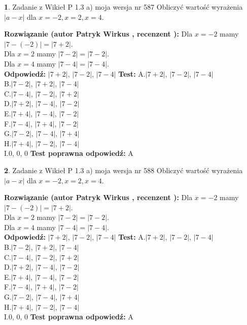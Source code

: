 \documentclass[12pt, a4paper]{article}
\theoremstyle{definition} %
\newtheorem{zad}{}
\newcommand{\zadStart}[1]{\begin{zad}#1\newline}
\newcommand{\zadStop}{\end{zad}}
\newcommand{\rozwStart}[2]{\noindent \textbf{Rozwiązanie (autor #1 , recenzent #2): }\newline}
\newcommand{\rozwStop}{\newline}
\newcommand{\odpStart}{\noindent \textbf{Odpowiedź:}\newline}
\newcommand{\odpStop}{\newline}
\newcommand{\testStart}{\noindent \textbf{Test:}\newline}
\newcommand{\testStop}{\newline}
\newcommand{\kluczStart}{\noindent \textbf{Test poprawna odpowiedź:}\newline}
\newcommand{\kluczStop}{\newline}
\begin{document}
\zadStart{Zadanie z Wikieł P 1.3 a) moja wersja nr 587}
Obliczyć wartość wyrażenia $|a - x|$ dla $x=-2,x=2,x=4$.
\zadStop
\rozwStart{Patryk Wirkus}{}
Dla $x = -2$ mamy $|7 - (-2)| = |7 + 2|$.\\
Dla $x = 2$ mamy $|7 - 2| = |7 - 2|$.\\
Dla $x = 4$ mamy $|7 - 4| = |7 - 4|$.\\
\rozwStop
\odpStart
$|7 + 2|$, $|7 - 2|$, $|7 - 4|$
\odpStop
\testStart
A.$|7 + 2|$, $|7 - 2|$, $|7 - 4|$\\
B.$|7 - 2|$, $|7 + 2|$, $|7 - 4|$\\
C.$|7 - 4|$, $|7 - 2|$, $|7 + 2|$\\
D.$|7 + 2|$, $|7 - 4|$, $|7 - 2|$\\
E.$|7 + 4|$, $|7 - 4|$, $|7 - 2|$\\
F.$|7 - 4|$, $|7 + 4|$, $|7 - 2|$\\
G.$|7 - 2|$, $|7 - 4|$, $|7 + 4|$\\
H.$|7 + 4|$, $|7 - 2|$, $|7 - 4|$\\
I.$0$, $0$, $0$
\testStop
\kluczStart
A
\kluczStop



\zadStart{Zadanie z Wikieł P 1.3 a) moja wersja nr 588}
Obliczyć wartość wyrażenia $|a - x|$ dla $x=-2,x=2,x=4$.
\zadStop
\rozwStart{Patryk Wirkus}{}
Dla $x = -2$ mamy $|7 - (-2)| = |7 + 2|$.\\
Dla $x = 2$ mamy $|7 - 2| = |7 - 2|$.\\
Dla $x = 4$ mamy $|7 - 4| = |7 - 4|$.\\
\rozwStop
\odpStart
$|7 + 2|$, $|7 - 2|$, $|7 - 4|$
\odpStop
\testStart
A.$|7 + 2|$, $|7 - 2|$, $|7 - 4|$\\
B.$|7 - 2|$, $|7 + 2|$, $|7 - 4|$\\
C.$|7 - 4|$, $|7 - 2|$, $|7 + 2|$\\
D.$|7 + 2|$, $|7 - 4|$, $|7 - 2|$\\
E.$|7 + 4|$, $|7 - 4|$, $|7 - 2|$\\
F.$|7 - 4|$, $|7 + 4|$, $|7 - 2|$\\
G.$|7 - 2|$, $|7 - 4|$, $|7 + 4|$\\
H.$|7 + 4|$, $|7 - 2|$, $|7 - 4|$\\
I.$0$, $0$, $0$
\testStop
\kluczStart
A
\kluczStop
\end{document}
